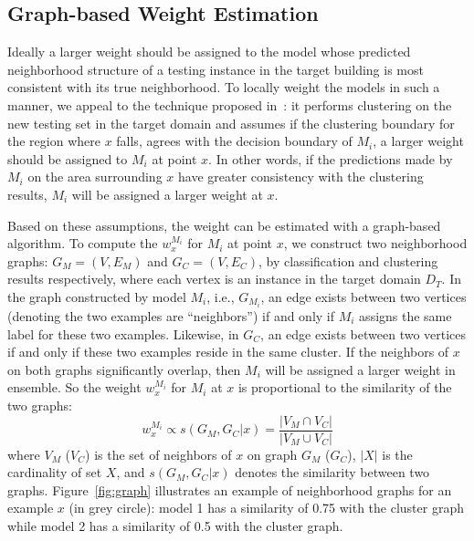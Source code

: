 \subsection{Graph-based Weight Estimation}\label{sec:gwe}
Ideally a larger weight should be assigned to the model whose predicted neighborhood structure of a testing instance in the target building is most consistent with its true neighborhood. To locally weight the models in such a manner, we appeal to
the technique proposed in~\cite{lwe}: it performs clustering on the new testing set in the target domain and assumes if the clustering boundary for the region where $x$ falls, agrees with the decision boundary of $M_i$,
a larger weight should be assigned to $M_i$ at point $x$.
In other words, if the predictions made by $M_i$ on the area surrounding $x$ have greater consistency with the clustering results, $M_i$ will be assigned
a larger weight at $x$.

Based on these assumptions, the weight can be estimated with a graph-based algorithm.
To compute the $w_{x}^{M_i}$ for $M_i$ at point $x$, we construct two neighborhood graphs:
$G_M = (V, E_M)$ and $G_C = (V, E_C)$, by classification and clustering results respectively,
where each vertex is an instance in the target domain $D_T$. In the graph constructed by model $M_i$, i.e., $G_{M_i}$, an edge exists between two vertices (denoting the two examples are ``neighbors'') if and only if $M_i$ assigns the same label for these two examples. Likewise, in $G_C$, an edge exists between two vertices if and only if these two examples reside in the same cluster.
If the neighbors of $x$ on both graphs significantly overlap, then $M_i$ will be assigned a larger weight in ensemble.
So the weight $w_{x}^{M_i}$ for $M_i$ at $x$ is proportional to the similarity of the two graphs:
\begin{equation}\label{eq_sim}
w_{x}^{M_i} \propto s(G_M, G_C|x) = \frac {|V_M \cap V_C|} {|V_M \cup V_C|}
\end{equation}
where $V_M$ ($V_C$) is the set of neighbors of $x$ on graph $G_M$ ($G_C$), $|X|$ is the cardinality of set $X$, and $s(G_M, G_C|x)$ denotes the similarity between two graphs.
Figure~\ref{fig:graph} illustrates an example of neighborhood graphs for an example $x$ (in grey circle): model 1 has a similarity of 0.75 with the cluster graph
 while model 2 has a similarity of 0.5 with the cluster graph.

